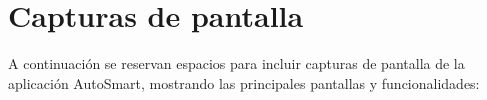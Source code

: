\section{Capturas de pantalla}
A continuación se reservan espacios para incluir capturas de pantalla de la aplicación AutoSmart, mostrando las principales pantallas y funcionalidades:


